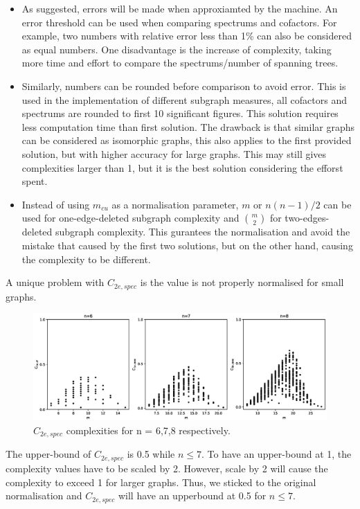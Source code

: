 \documentclass[12pt]{article}
\begin{document}
\begin{itemize}
    \item As suggested, errors will be made when approxiamted by the machine. An error threshold can be used when comparing spectrums and cofactors. For example, two numbers with relative error less than 1\% can also be considered as equal numbers. One disadvantage is the increase of complexity, taking more time and effort to compare the spectrums/number of spanning trees.
    \item Similarly, numbers can be rounded before comparison to avoid error. This is used in the implementation of different subgraph measures, all cofactors and spectrums are rounded to first 10 significant figures. This solution requires less computation time than first solution. The drawback is that similar graphs can be considered as isomorphic graphs, this also applies to the first provided solution, but with higher accuracy for large graphs. This may still gives complexities larger than 1, but it is the best solution considering the efforst spent.
    \item Instead of using $m_{cu}$ as a normalisation parameter, $m$ or $n(n-1)/2$ can be used for one-edge-deleted subgraph complexity and $\genfrac(){0pt}{2}{m}{2}$ for two-edges-deleted subgraph complexity. This gurantees the normalisation and avoid the mistake that caused by the first two solutions, but on the other hand, causing the complexity to be different.
\end{itemize}
A unique problem with $C_{2e,spec}$ is the value is not properly normalised for small graphs.

\begin{figure}[ht]
    \includegraphics[width = \textwidth]{c2espec.eps}
    \caption{$C_{2e,spec}$ complexities for n = 6,7,8 respectively.}
    \centering
\end{figure}
\noindent
The upper-bound of $C_{2e,spec}$ is 0.5 while $ n\leq7 $. To have an upper-bound at 1, the complexity values have to be scaled by 2. However, scale by 2 will cause the complexity to exceed 1 for larger graphs. Thus, we sticked to the original normalisation and $C_{2e,spec}$ will have an upperbound at 0.5 for $n \leq 7$.
\end{document}
